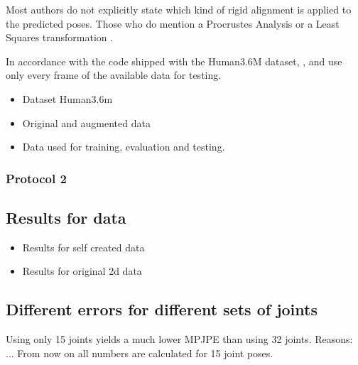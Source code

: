 Most authors do not explicitly state which kind of rigid alignment is applied to the predicted poses.
Those who do mention a Procrustes Analysis \cite{sun17, tome17} or a Least Squares transformation \cite{kostrikov14}. 

In accordance with the code shipped with the Human3.6M dataset, \citet{sun17}, \citet{chen17} and \citet{moreno-noguer16} use only every  frame of the available data for testing.




\begin{itemize}
	\item Dataset Human3.6m
	\item Original and augmented data
	\item Data used for training, evaluation and testing.
\end{itemize}
\subsubsection{Protocol 2}\label{sec:protocol2}
%	 
\subsection{Results for data}\label{sec:data-results}
\begin{itemize}
	\item Results for self created data
	\item Results for original 2d data
\end{itemize}
\subsection{Different errors for different sets of joints}
	Using only 15 joints yields a much lower MPJPE than using 32 joints. Reasons: ...	
	From now on all numbers are calculated for 15 joint poses.